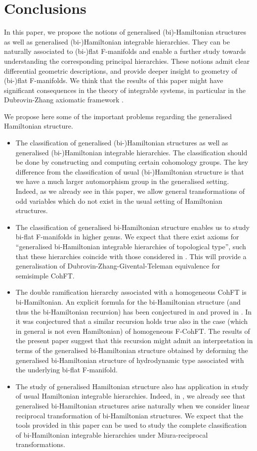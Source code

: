 \documentclass[11pt,a4paper]{amsart}
\numberwithin{equation}{section}
\numberwithin{equation}{section}
\begin{document}
\section{Conclusions}
In this paper, we propose the notions of generalised (bi)-Hamiltonian structures as well as generalised (bi-)Hamiltonian integrable hierarchies. They can be naturally associated to (bi-)flat F-manifolds and enable a further study towards understanding the corresponding principal hierarchies. These notions admit clear differential geometric descriptions, and provide deeper insight to geometry of (bi-)flat F-manifolds.
We think that the results of this paper might have significant consequences in the theory of integrable systems, in particular in the  Dubrovin-Zhang axiomatic framework \cite{DZ01}.

We propose here some of the important problems regarding the generalised Hamiltonian structure.
\begin{itemize} 
\item The classification of generalised (bi-)Hamiltonian structures as well as generalised (bi-)Hamiltonian integrable hierarchies. The classification should be done by constructing and computing certain cohomology groups. The key difference from the classification of usual (bi-)Hamiltonian structure is that we have a much larger automorphism group in the generalised setting. Indeed, as we already see in this paper, we allow general transformations of odd variables which do not exist in the usual setting of Hamiltonian structures.
 \item The classification of generalised bi-Hamiltonian structure enables us to study bi-flat F-manifolds in higher genus. We expect that there exist axioms for ``generalised bi-Hamiltonian integrable hierarchies of topological type'', such that these hierarchies coincide with those considered in \cite{ABLR1}. This will provide a generalisation of Dubrovin-Zhang-Givental-Teleman equivalence for semisimple CohFT.
\item The double ramification hierarchy associated with a homogeneous CohFT is bi-Hamiltonian. An explicit formula for the bi-Hamiltonian structure (and thus the bi-Hamiltonian recursion) has been conjectured in \cite{BRS} and proved in \cite{BR}. In \cite{ABLR2} it was conjectured that a similar recursion holds true also in the case (which in general is not even Hamiltonian) of homogeneous F-CohFT. The results of the present paper suggest that this recursion might admit an interpretation in terms of the generalised bi-Hamiltonian structure obtained by deforming the generalised bi-Hamiltonian structure of hydrodynamic type associated with the underlying bi-flat F-manifold. 

\item The study of generalised Hamiltonian structure also has application in study of usual Hamiltonian integrable hierarchies. Indeed, in \cite{LWZ4}, we already see that generalised bi-Hamiltonian structures arise naturally when we consider linear reciprocal transformation of bi-Hamiltonian structures. We expect that the tools provided in this paper can be used to study the complete classification of bi-Hamiltonian integrable hierarchies under Miura-reciprocal transformations.
 \end{itemize}
\end{document}
